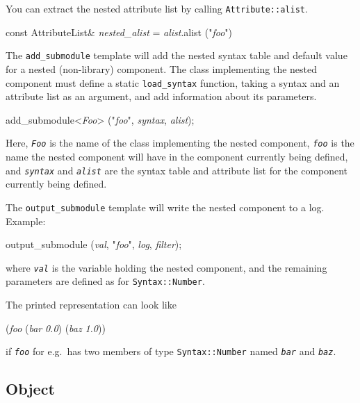 \documentclass{article}
\newcommand{\code}[1]{\texttt{#1}}
\begin{document}
You can extract the nested attribute list by calling
\code{Attribute::alist}.
\begin{center}
  \begin{tt}
    const AttributeList\& \textit{nested\_alist} 
      = \textit{alist}.alist ("\textit{foo}")
  \end{tt}
\end{center}

The \code{add\_submodule} template will add the nested syntax table
and default value for a nested (non-library) component.  The class
implementing the nested component must define a static
\code{load\_syntax} function, taking a syntax and an attribute list as
an argument, and add information about its parameters.
\begin{center}
  \begin{tt}
    add\_submodule<\textit{Foo}> ("\textit{foo}",
                                 \textit{syntax}, \textit{alist});
  \end{tt}
\end{center}
Here, \texttt{\textit{Foo}} is the name of the class implementing the
nested component, \texttt{\textit{foo}} is the name the nested
component will have in the component currently being defined, and
\texttt{\textit{syntax}} and \texttt{\textit{alist}} are the syntax
table and attribute list for the component currently being defined. 

The \code{output\_submodule} template will write the nested component
to a log.  Example:
\begin{center}
  \begin{tt}
    output\_submodule (\textit{val}, "\textit{foo}", 
                       \textit{log}, \textit{filter});
  \end{tt}
\end{center}
where \texttt{\textit{val}} is the variable holding the nested
component, and the remaining parameters are defined as for
\texttt{Syntax::Number}. 

The printed representation can look like
\begin{center}
  \begin{tt}
    (\textit{foo} (\textit{bar} \textit{0.0}) (\textit{baz} \textit{1.0}))
  \end{tt}
\end{center}
if \texttt{\textit{foo}} for e.g.\ has two members of type
\code{Syntax::Number} named \texttt{\textit{bar}} and
\texttt{\textit{baz}}. 

\subsection{Object}
\end{document}
